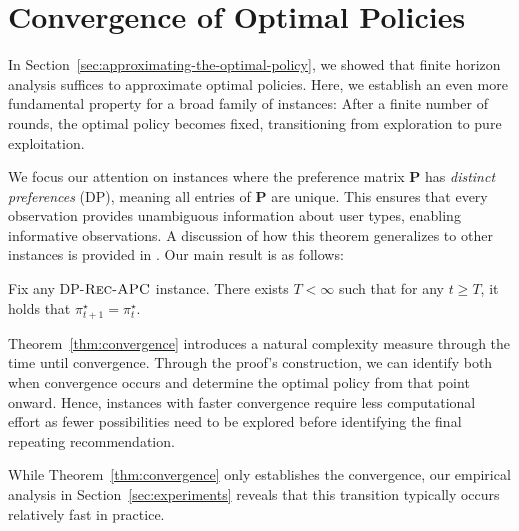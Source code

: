 \section{Convergence of Optimal Policies}
\label{sec:convergence-of-the-optimal-policy}
In Section~\ref{sec:approximating-the-optimal-policy}, we showed that finite horizon analysis suffices to approximate optimal policies. Here, we establish an even more fundamental property for a broad family of instances: After a finite number of rounds, the optimal policy becomes fixed, transitioning from exploration to pure exploitation.

We focus our attention on instances where the preference matrix $\bm{P}$ has \emph{distinct preferences} (DP), meaning all entries of $\bm{P}$ are unique. This ensures that every observation provides unambiguous information about user types, enabling informative observations. A discussion of how this theorem generalizes to other instances is provided in . Our main result is as follows:

\begin{theorem}\label{thm:convergence}
   Fix any DP-$\textsc{Rec-APC}$ instance. There exists $T < \infty$ such that for any $t \geq T$, it holds that $\pi^\star_{t+1}=\pi^\star_{t}$.
\end{theorem}

Theorem~\ref{thm:convergence} introduces a natural complexity measure through the time until convergence. Through the proof's construction, we can identify both when convergence occurs and determine the optimal policy from that point onward. Hence, instances with faster convergence require less computational effort as fewer possibilities need to be explored before identifying the final repeating recommendation.

While Theorem~\ref{thm:convergence} only establishes the convergence, our empirical analysis in Section~\ref{sec:experiments} reveals that this transition typically occurs relatively fast in practice.


